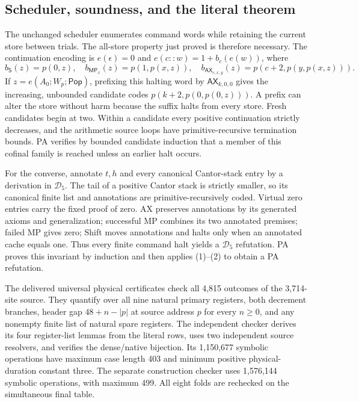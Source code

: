 \subsection{Scheduler, soundness, and the literal theorem}

The unchanged scheduler enumerates command words while retaining the
current store between trials. The all-store property just proved is
therefore necessary. The continuation encoding is $e(\epsilon)=0$ and
$e(c::w)=1+b_c(e(w))$, where
\[
 b_{\mathsf S}(z)=p(0,z),\quad
 b_{\mathsf{MP}_x}(z)=p(1,p(x,z)),\quad
 b_{\mathsf{AX}_{c,x,y}}(z)=p(c+2,p(y,p(x,z))).
\]
If $z=e(A_0;W_p;\mathsf{Pop})$, prefixing this halting word by
$\mathsf{AX}_{k,0,0}$ gives the increasing, unbounded candidate codes
$p(k+2,p(0,p(0,z)))$. A prefix can alter the store without harm because
the suffix halts from every store. Fresh candidates begin at two.
Within a candidate every positive continuation strictly decreases,
and the arithmetic source loops have primitive-recursive termination
bounds. PA verifies by bounded candidate induction that a member of
this cofinal family is reached unless an earlier halt occurs.

For the converse, annotate $t,h$ and every canonical Cantor-stack entry
by a derivation in $\mathcal D_5$. The tail of a positive Cantor stack
is strictly smaller, so its canonical finite list and annotations are
primitive-recursively coded. Virtual zero entries carry the fixed proof
of zero. AX preserves annotations by its generated axioms and
generalization; successful MP combines its two annotated premises;
failed MP gives zero; Shift moves annotations and halts only when an
annotated cache equals one. Thus every finite command halt yields a
$\mathcal D_5$ refutation. PA proves this invariant by induction and
then applies (1)--(2) to obtain a PA refutation.

The delivered universal physical certificates check all 4,815 outcomes
of the 3,714-site source. They quantify over all nine natural primary
registers, both decrement branches, header gap $48+n-|p|$ at source
address $p$ for every $n\geq0$,
and any nonempty finite list of natural spare registers. The independent
checker derives its four register-list lemmas from the literal rows,
uses two independent source resolvers, and verifies the dense/native
bijection. Its 1,150,677 symbolic operations have maximum case length
403 and minimum positive physical-duration constant three. The separate
construction checker uses 1,576,144 symbolic operations, with maximum
499. All eight folds are rechecked on the simultaneous final table.

